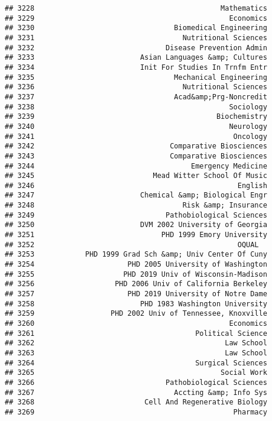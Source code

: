 \documentclass[
]{article}
\begin{document}
\begin{verbatim}
## 3228                                            Mathematics
## 3229                                              Economics
## 3230                                 Biomedical Engineering
## 3231                                   Nutritional Sciences
## 3232                               Disease Prevention Admin
## 3233                         Asian Languages &amp; Cultures
## 3234                         Init For Studies In Trnfm Entr
## 3235                                 Mechanical Engineering
## 3236                                   Nutritional Sciences
## 3237                                 Acad&amp;Prg-Noncredit
## 3238                                              Sociology
## 3239                                           Biochemistry
## 3240                                              Neurology
## 3241                                               Oncology
## 3242                                Comparative Biosciences
## 3243                                Comparative Biosciences
## 3244                                     Emergency Medicine
## 3245                            Mead Witter School Of Music
## 3246                                                English
## 3247                         Chemical &amp; Biological Engr
## 3248                                   Risk &amp; Insurance
## 3249                               Pathobiological Sciences
## 3250                         DVM 2002 University of Georgia
## 3251                              PHD 1999 Emory University
## 3252                                                OQUAL  
## 3253            PHD 1999 Grad Sch &amp; Univ Center Of Cuny
## 3254                      PHD 2005 University of Washington
## 3255                     PHD 2019 Univ of Wisconsin-Madison
## 3256                   PHD 2006 Univ of California Berkeley
## 3257                      PHD 2019 University of Notre Dame
## 3258                         PHD 1983 Washington University
## 3259                  PHD 2002 Univ of Tennessee, Knoxville
## 3260                                              Economics
## 3261                                      Political Science
## 3262                                             Law School
## 3263                                             Law School
## 3264                                      Surgical Sciences
## 3265                                            Social Work
## 3266                               Pathobiological Sciences
## 3267                                 Accting &amp; Info Sys
## 3268                          Cell And Regenerative Biology
## 3269                                               Pharmacy

\end{verbatim}
\end{document}
